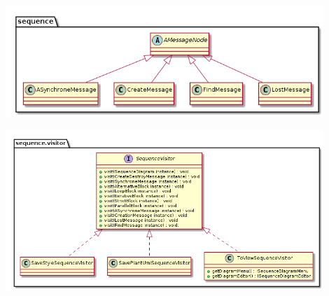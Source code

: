 \documentclass[a4paper,10pt]{article}
\begin{document}
	\begin{center}
	  \includegraphics[width=12cm]{Image/sequenceMessageInline.png}
	\end{center}
	\begin{center}
	  \includegraphics[width=12cm]{Image/sequenceVisiteur.png}
	\end{center}
\end{document}
